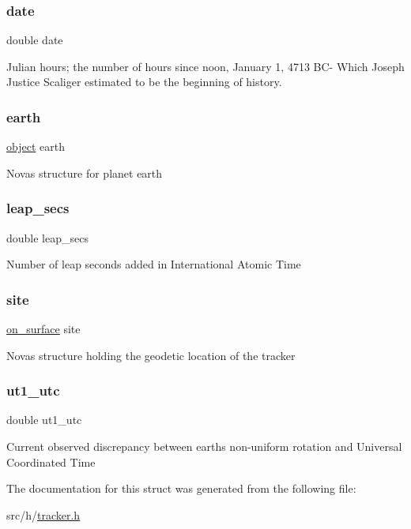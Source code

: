 \subsubsection{\texorpdfstring{date}{date}}
{\footnotesize\ttfamily double date}

Julian hours; the number of hours since noon, January 1, 4713 B\+C-\/ Which Joseph Justice Scaliger estimated to be the beginning of history. \mbox{\label{struct_tracker_ae1beefa1f286be116b00f0e8ad83d002}} 
\subsubsection{\texorpdfstring{earth}{earth}}
{\footnotesize\ttfamily \mbox{\hyperlink{structobject}{object}} earth}

Novas structure for planet earth \mbox{\label{struct_tracker_ad762d92dc4fcba312c9d2d11ff3a7e67}} 
\subsubsection{\texorpdfstring{leap\+\_\+secs}{leap\_secs}}
{\footnotesize\ttfamily double leap\+\_\+secs}

Number of leap seconds added in International Atomic Time \mbox{\label{struct_tracker_afb38e182752f31d6a08f82d960955438}} 
\subsubsection{\texorpdfstring{site}{site}}
{\footnotesize\ttfamily \mbox{\hyperlink{structon__surface}{on\+\_\+surface}} site}

Novas structure holding the geodetic location of the tracker \mbox{\label{struct_tracker_a9eef053f0153643589ed50d5f193afe7}} 
\subsubsection{\texorpdfstring{ut1\+\_\+utc}{ut1\_utc}}
{\footnotesize\ttfamily double ut1\+\_\+utc}

Current observed discrepancy between earth\textquotesingle{}s non-\/uniform rotation and Universal Coordinated Time 

The documentation for this struct was generated from the following file\+:\begin{DoxyCompactItemize}
\item 
src/h/\mbox{\hyperlink{tracker_8h}{tracker.\+h}}\end{DoxyCompactItemize}
